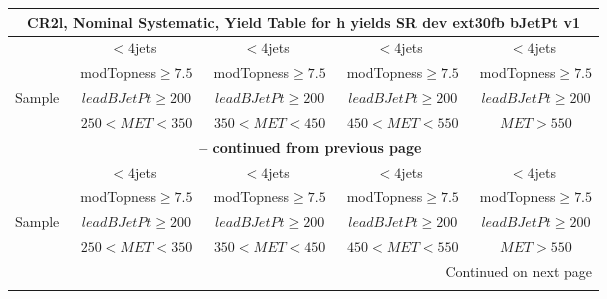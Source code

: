 \documentclass{article}
\begin{document}
\begin{longtable}{|l|c|c|c|c|} 
 
\multicolumn{5}{c}{ CR2l, Nominal Systematic, Yield Table for h yields SR dev ext30fb bJetPt v1 }\\* \hline 
  & $<4$jets  & $<4$jets  & $<4$jets  & $<4$jets \\* 
  & ~modTopness$\ge7.5$  & ~modTopness$\ge7.5$  & ~modTopness$\ge7.5$  & ~modTopness$\ge7.5$ \\* 
Sample  & ~$leadBJetPt\ge200$  & ~$leadBJetPt\ge200$  & ~$leadBJetPt\ge200$  & ~$leadBJetPt\ge200$ \\* 
  & ~$250<MET<350$  & ~$350<MET<450$  & ~$450<MET<550$  & ~$MET>550$ \\* 
\hline \hline 
\endfirsthead 
 
\multicolumn{5}{c}{{\bfseries \tablename\ \thetable{} -- continued from previous page}}\\* \hline 
  & $<4$jets  & $<4$jets  & $<4$jets  & $<4$jets \\* 
  & ~modTopness$\ge7.5$  & ~modTopness$\ge7.5$  & ~modTopness$\ge7.5$  & ~modTopness$\ge7.5$ \\* 
Sample  & ~$leadBJetPt\ge200$  & ~$leadBJetPt\ge200$  & ~$leadBJetPt\ge200$  & ~$leadBJetPt\ge200$ \\* 
  & ~$250<MET<350$  & ~$350<MET<450$  & ~$450<MET<550$  & ~$MET>550$ \\* 
\hline \hline 
\endhead 
 
\multicolumn{5}{|r|}{{Continued on next page}}\\* \hline 
\endfoot 
 
 
\endlastfoot 
 

\end{longtable}
\end{document}

